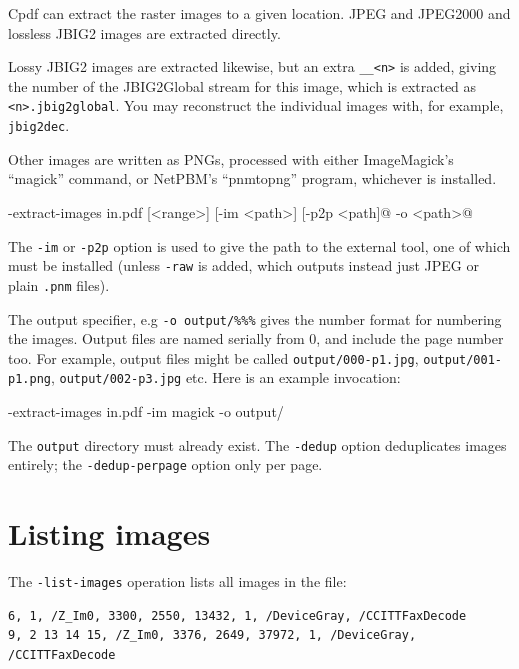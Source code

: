 \documentclass{book}
\begin{document}
Cpdf can extract the raster images to a given location. JPEG and JPEG2000 and lossless JBIG2 images are extracted directly.

Lossy JBIG2 images are extracted likewise, but an extra \texttt{\_\_<n>} is added, giving the number of the JBIG2Global stream for this image, which is extracted as \texttt{<n>.jbig2global}. You may reconstruct the individual images with, for example, \texttt{jbig2dec}.

Other images are written as PNGs, processed with either ImageMagick's ``magick'' command, or NetPBM's ``pnmtopng'' program, whichever is installed.

  \begin{framed}
  \noindent\small\verb@cpdf -extract-images in.pdf [<range>] [-im <path>] [-p2p <path]@
  \noindent\small{} -o <path>@
  \end{framed}

\noindent The \texttt{-im} or \texttt{-p2p} option is used to give the path to the external tool, one of which must be installed (unless \texttt{-raw} is added, which outputs instead just JPEG or plain \texttt{.pnm} files).

The output specifier, e.g \verb!-o output/%%%! gives the number format for numbering the images. Output files are named serially from 0, and include the page number too. For example, output files might be called \texttt{output/000-p1.jpg}, \texttt{output/001-p1.png}, \texttt{output/002-p3.jpg} etc. Here is an example invocation:

  \begin{framed}
  \noindent\small\verb@cpdf -extract-images in.pdf -im magick -o output/%%%@
  \end{framed}

\noindent The \texttt{output} directory must already exist. The \texttt{-dedup} option deduplicates images entirely; the \texttt{-dedup-perpage} option only per page.

\section{Listing images}

The \texttt{-list-images} operation lists all images in the file:

  \begin{framed}
{\small\begin{verbatim}6, 1, /Z_Im0, 3300, 2550, 13432, 1, /DeviceGray, /CCITTFaxDecode
9, 2 13 14 15, /Z_Im0, 3376, 2649, 37972, 1, /DeviceGray, /CCITTFaxDecode\end{verbatim}}
  \end{framed}
\end{document}
